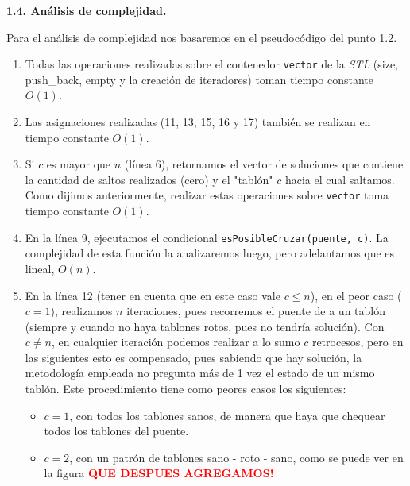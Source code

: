 \vspace*{0.75cm} \noindent



\noindent
\textbf{1.4. Análisis de complejidad.}

\vspace*{0.3cm}

Para el análisis de complejidad nos basaremos en el pseudocódigo del punto 1.2.

\begin{enumerate}
\item Todas las operaciones realizadas sobre el contenedor \verb|vector| de la \textit{STL} (size, push_back, empty y la creación de iteradores)
toman tiempo constante $O(1)$.

\item Las asignaciones realizadas (11, 13, 15, 16 y 17) también se realizan en tiempo constante $O(1)$.

\item Si $c$ es mayor que $n$ (línea 6), retornamos el vector de soluciones que contiene la cantidad de saltos realizados (cero) y
el "tablón" $c$ hacia el cual saltamos. Como dijimos anteriormente, realizar estas operaciones sobre \verb|vector|
toma tiempo constante $O(1)$.

\item En la línea 9, ejecutamos el condicional \verb|esPosibleCruzar(puente, c)|. La complejidad de esta función la
analizaremos luego, pero adelantamos que es lineal, $O(n)$.

\item En la línea 12 (tener en cuenta que en este caso vale $c \leq n$), en el peor caso ($c = 1$), realizamos $n$ iteraciones,
pues recorremos el puente de a un tablón (siempre y cuando no haya tablones rotos, pues no tendría solución). Con $c \neq n$,
en cualquier iteración podemos realizar a lo sumo $c$ retrocesos, pero en las siguientes esto es compensado, pues sabiendo que
hay solución, la metodología empleada no pregunta más de 1 vez el estado de un mismo tablón. Este procedimiento tiene como peores
casos los siguientes:
  \begin{itemize}
    \item $c = 1$, con todos los tablones sanos, de manera que haya que chequear todos los tablones del puente.

    \item $c = 2$, con un patrón de tablones sano - roto - sano, como se puede ver en la figura \textcolor{red}{\textbf{QUE DESPUES AGREGAMOS!}}


\end{itemize}
\end{enumerate}
